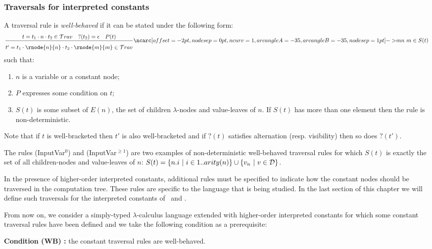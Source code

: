 \subsubsection{Traversals for interpreted constants}

\begin{dfn}
\label{def:wellbehaved_traversal}
A traversal rule is \emph{well-behaved} if it can be stated under the following form:
$$\rulef{t = t_1\cdot n \cdot t_2 \in \travset \quad ?(t_2) = \epsilon \quad P(t)}
  { \stackrel{  \rule{0pt}{3pt} }{t' = t_1\cdot \rnode{n}{n} \cdot t_2 \cdot \rnode{m}{m} \in \travset} }
   \bkptr[nodesep=1pt]{35}{m}{n}
    \ m\in S(t)
   $$
such that:
\begin{enumerate}
  \item $n$ is a variable or a constant node;
  \item $P$ expresses some condition on $t$;
  \item $S(t)$ is some subset of $E(n)$, the set of children $\lambda$-nodes and value-leaves of $n$.
  If $S(t)$ has more than one element then the rule is non-deterministic.
\end{enumerate}
\end{dfn}
Note that if $t$ is well-bracketed then $t'$ is also well-bracketed
and if $?(t)$ satisfies alternation (resp. visibility) then so does $?(t')$.


The rules (InputVar$^0$) and (InputVar$^{\geq1}$) are two examples of
non-deterministic well-behaved traversal rules for which
$S(t)$ is exactly the set of all children-nodes and value-leaves of $n$:
$S(t) = \{ n.i \ |\ i \in 1..arity(n) \} \cup  \{ v_n \ | \ v \in \mathcal{D} \} $.


In the presence of higher-order interpreted constants, additional rules must be specified to indicate how
the constant nodes should be traversed in the computation tree. These rules
are specific to the language that is being studied.
In the last section of this chapter we will define such traversals for the interpreted constants of
\pcf\ and \ialgol.

From now on, we consider a simply-typed $\lambda$-calculus language extended with
higher-order interpreted constants for which some constant traversal rules have been defined
and we take the following condition as a prerequisite:
\begin{center}
  \textbf{Condition (WB) :} the constant traversal rules are well-behaved.
\end{center}


